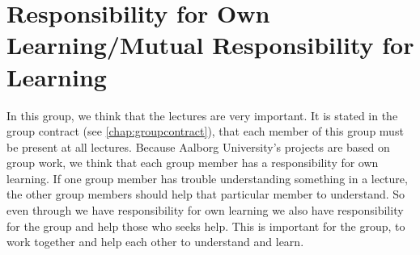 \section{Responsibility for Own Learning/Mutual Responsibility for Learning}
In this group, we think that the lectures are very important. It is stated in the group contract (see \ref{chap:groupcontract}), that each member of this group must be present at all lectures. Because Aalborg University's projects are based on group work, we think that each group member has a responsibility for own learning. If one group member has trouble understanding something in a lecture, the other group members should help that particular member to understand. So even through we have responsibility for own learning we also have responsibility for the group and help those who seeks help. This is important for the group, to work together and help each other to understand and learn.